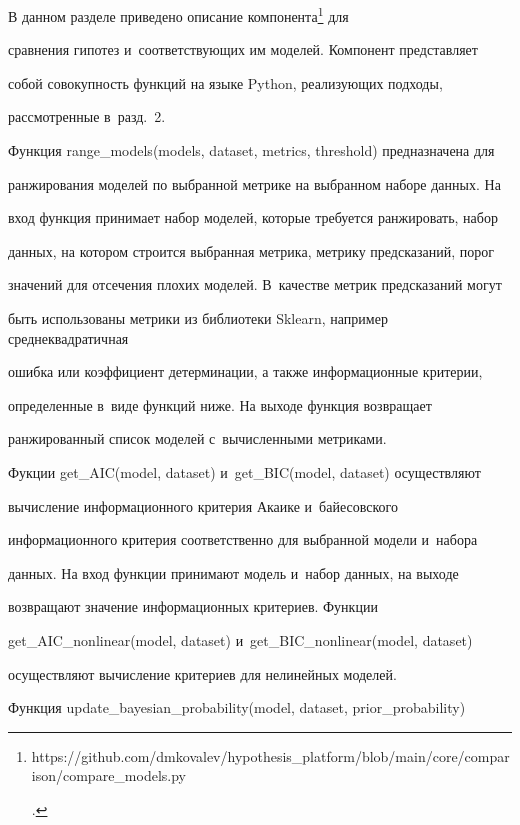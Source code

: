  

     В данном разделе приведено описание компонента\footnote{{\sf  

https://github.com/dmkovalev/hypothesis\_platform/blob/main/core/comparison/compare\_\linebreak models.py}.} для 

сравнения гипотез и~соответствующих им моделей. Компонент представляет 

собой совокупность функций на языке Python, реализующих подходы, 

рассмотренные в~разд.~2. 

     

     Функция range\_models(models, dataset, metrics, threshold) предназначена для 

ранжирования моделей по выбранной метрике на выбранном наборе данных. На 

вход функция принимает набор моделей, которые требуется ранжировать, набор 

данных, на котором строится выбранная метрика, метрику предсказаний, порог 

значений для отсечения плохих моделей. В~качестве метрик предсказаний могут 

быть использованы метрики из библиотеки Sklearn, например сред\-не\-квад\-ра\-тич\-ная 

ошибка или коэффициент детерминации, а также информационные критерии, 

определенные в~виде функций ниже. На выходе функция возвращает 

ранжированный список моделей с~вычисленными метриками.

     

     Фукции get\_AIC(model, dataset) и~get\_BIC(model, dataset) осуществляют 

вычисление информационного критерия Акаике и~байесовского 

информационного критерия соответственно для выбранной модели и~набора 

данных. На вход функции принимают модель и~набор данных, на выходе 

возвращают значение информационных критериев. Функции 

get\_AIC\_nonlinear(model, dataset) и~get\_BIC\_nonlinear(model, dataset) 

осуществляют вычисление критериев для нелинейных моделей.

     

     Функция update\_bayesian\_probability(model, dataset, prior\_probability) 

